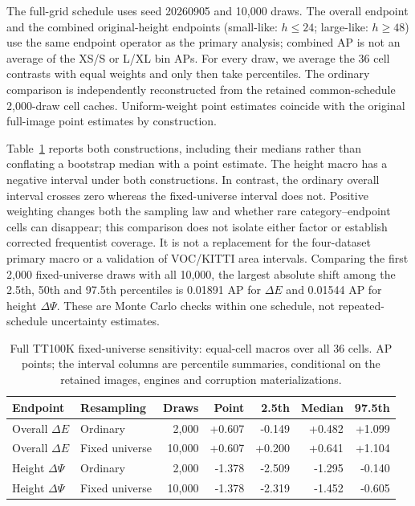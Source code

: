 \documentclass[10pt]{article}
\newcommand{\DeltaE}{\Delta E}
\newcommand{\DeltaPsi}{\Delta\Psi}
\begin{document}
The full-grid schedule uses seed 20260905 and 10,000 draws. The overall
endpoint and the combined original-height endpoints (small-like: $h\leq24$;
large-like: $h\geq48$) use the same endpoint operator as the primary analysis;
combined AP is not an average of the XS/S or L/XL bin APs. For every draw,
we average the 36 cell contrasts with equal weights and only then take
percentiles. The ordinary comparison is independently reconstructed from the
retained common-schedule 2,000-draw cell caches. Uniform-weight point estimates
coincide with the original full-image point estimates by construction.

Table~\ref{tab:tt-full-fixed} reports both constructions, including their
medians rather than conflating a bootstrap median with a point estimate.
The height macro has a negative interval under both constructions. In contrast,
the ordinary overall interval crosses zero whereas the fixed-universe interval
does not. Positive weighting changes both the sampling law and whether rare
category--endpoint cells can disappear; this comparison does not isolate either
factor or establish corrected frequentist coverage. It is not a replacement
for the four-dataset primary macro or a validation of VOC/KITTI area intervals.
Comparing the first 2,000 fixed-universe draws with all 10,000, the largest
absolute shift among the 2.5th, 50th and 97.5th percentiles is 0.01891 AP for
$\DeltaE$ and 0.01544 AP for height $\DeltaPsi$. These are Monte Carlo checks
within one schedule, not repeated-schedule uncertainty estimates.

\begin{table}[htbp]
\centering\small
\caption{Full TT100K fixed-universe sensitivity: equal-cell macros over all
36 cells. AP points; the interval columns are percentile summaries, conditional
on the retained images, engines and corruption materializations.}
\label{tab:tt-full-fixed}
\begin{tabular}{llrrrrr}
\toprule
Endpoint & Resampling & Draws & Point & 2.5th & Median & 97.5th \\
\midrule
Overall $\DeltaE$ & Ordinary & 2,000 & +0.607 & -0.149 & +0.482 & +1.099 \\
Overall $\DeltaE$ & Fixed universe & 10,000 & +0.607 & +0.200 & +0.641 & +1.104 \\
Height $\DeltaPsi$ & Ordinary & 2,000 & -1.378 & -2.509 & -1.295 & -0.140 \\
Height $\DeltaPsi$ & Fixed universe & 10,000 & -1.378 & -2.319 & -1.452 & -0.605 \\
\bottomrule
\end{tabular}
\end{table}
\end{document}
